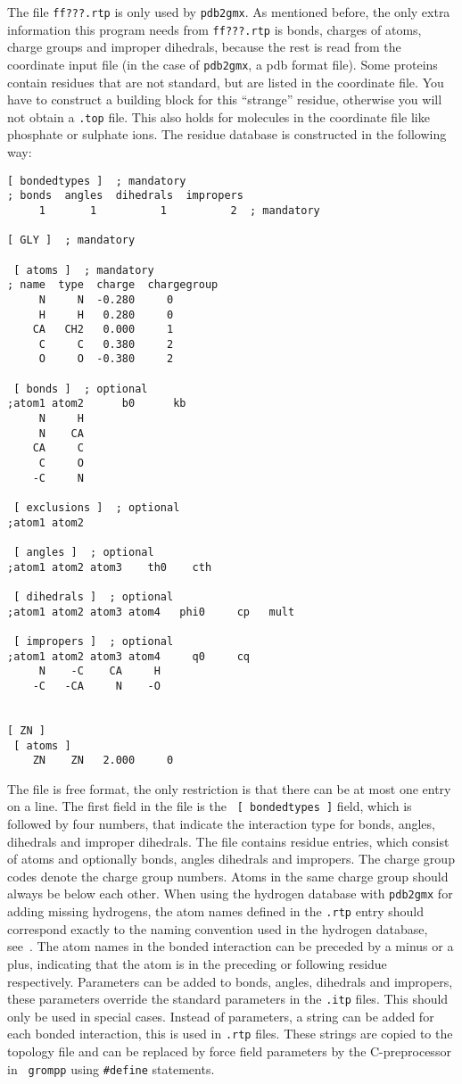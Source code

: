 The file {\tt ff???.rtp} is only used by {\tt pdb2gmx}.
As mentioned before, the only extra information this
program needs from {\tt ff???.rtp} is bonds, charges of atoms,
charge groups and improper dihedrals, because the rest is read from
the coordinate input file (in the case of {\tt pdb2gmx}, a pdb format
file). Some proteins contain residues that are not standard, but are
listed in the coordinate file. You have to construct a building block
for this ``strange'' residue, otherwise you will not obtain a
{\tt *.top} file. This also holds for molecules in the
coordinate file like phosphate or sulphate ions.
The residue database is constructed in the following way:
{\small\begin{verbatim}
[ bondedtypes ]  ; mandatory
; bonds  angles  dihedrals  impropers
     1       1          1          2  ; mandatory

[ GLY ]  ; mandatory

 [ atoms ]  ; mandatory 
; name  type  charge  chargegroup 
     N     N  -0.280     0
     H     H   0.280     0
    CA   CH2   0.000     1
     C     C   0.380     2
     O     O  -0.380     2

 [ bonds ]  ; optional
;atom1 atom2      b0      kb
     N     H
     N    CA
    CA     C
     C     O
    -C     N

 [ exclusions ]  ; optional
;atom1 atom2

 [ angles ]  ; optional
;atom1 atom2 atom3    th0    cth

 [ dihedrals ]  ; optional
;atom1 atom2 atom3 atom4   phi0     cp   mult

 [ impropers ]  ; optional
;atom1 atom2 atom3 atom4     q0     cq
     N    -C    CA     H
    -C   -CA     N    -O


[ ZN ]
 [ atoms ]
    ZN    ZN   2.000     0
\end{verbatim}}

The file is free format, the only restriction is that there can be at
most one entry on a line.  The first field in the file is the {\tt
[~bondedtypes~]} field, which is followed by four numbers, that
indicate the interaction type for bonds, angles, dihedrals and
improper dihedrals.  The file contains residue entries, which consist
of atoms and optionally bonds, angles dihedrals and impropers.  The
charge group codes denote the charge group numbers. Atoms in the same
charge group should always be below each other. When using the
hydrogen database with {\tt pdb2gmx} for adding missing hydrogens, the
atom names defined in the {\tt .rtp} entry should correspond exactly
to the naming convention used in the hydrogen database,
see~. The atom names in the bonded interaction can be
preceded by a minus or a plus, indicating that the atom is in the
preceding or following residue respectively.  Parameters can be added
to bonds, angles, dihedrals and impropers, these parameters override
the standard parameters in the {\tt .itp} files.  This should only be
used in special cases. Instead of parameters, a string can be added
for each bonded interaction, this is used in  {\tt .rtp}
files. These strings are copied to the topology file and can be
replaced by force field parameters by the C-preprocessor in {\tt
grompp} using {\tt \#define} statements.

